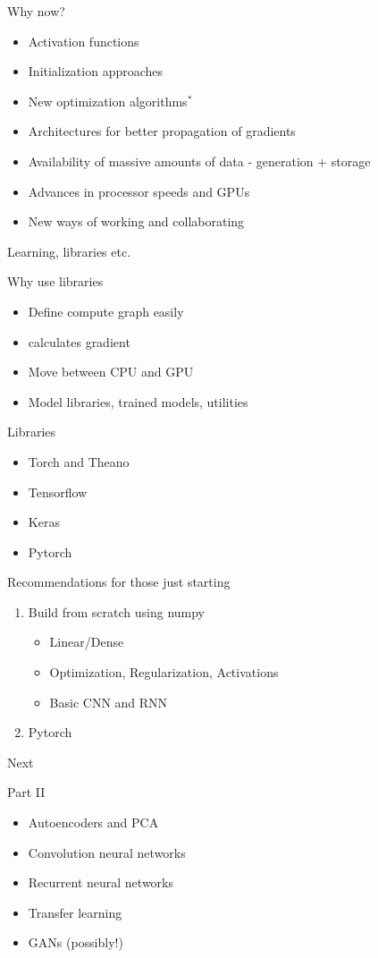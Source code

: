 \begin{frame}{Why now?}
\begin{itemize}
	\item Activation functions 
	\item Initialization approaches
	\item New optimization algorithms$^*$ 
	\item Architectures for better propagation of gradients 
	\item Availability of massive amounts of data - generation + storage 
	\item Advances in processor speeds and GPUs 
	\item New ways of working and collaborating
\end{itemize}
\end{frame}

\begin{frame}{Learning, libraries etc.}
\begin{block}{Why use libraries}
		\begin{itemize}
		\item Define compute graph easily
		\item calculates gradient 
		\item Move between CPU and GPU
		\item Model libraries, trained models, utilities  
		\end{itemize}
\end{block} 
\begin{block}{Libraries}
	\begin{itemize}
		\item Torch and Theano 
		\item Tensorflow  
		\item Keras
		\item Pytorch  
	\end{itemize}	
\end{block}

\begin{block}{Recommendations for those just starting}
	\begin{enumerate}
		\item Build from scratch using numpy 
		\begin{itemize}
			\item Linear/Dense 
			\item Optimization,  Regularization,  Activations 
			\item Basic CNN and RNN
		\end{itemize} 
		\item Pytorch  
	\end{enumerate}	
\end{block}
\end{frame}

\begin{frame}{Next}
	\begin{block}{Part II}
		\begin{itemize}
			\item Autoencoders and PCA 
			\item Convolution neural networks 
			\item Recurrent neural networks 
			\item Transfer learning 
			\item GANs (possibly!) 
		\end{itemize}		
	\end{block}

\end{frame}
